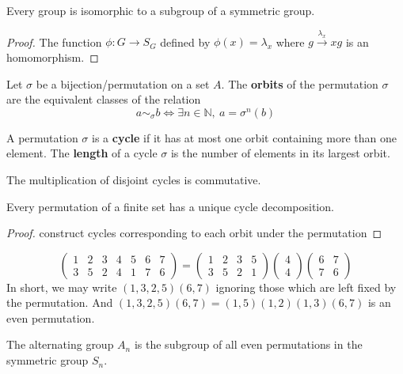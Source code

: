 \begin{theorem}[Cayley]
	Every group is isomorphic to a subgroup of a symmetric group.
\end{theorem}
\begin{proof}
	The function $\phi : G \to S_G$ defined by $\phi(x) = \lambda_x$ where $g \overset{\lambda_x}{\to} xg$ is an homomorphism.
\end{proof}

\begin{definition}
	Let $\sigma$ be a bijection/permutation on a set $A$.
	The \textbf{orbits} of the permutation $\sigma$ are the equivalent classes of the relation 
	$$a \sim_\sigma b \iff \exists n \in \mathbb{N},\ a = \sigma^n(b)$$
\end{definition}

\begin{definition}
	A permutation $\sigma$ is a \textbf{cycle} if it has at most one orbit containing more than one element.
	The \textbf{length} of a cycle $\sigma$ is the number of elements in its largest orbit. 
\end{definition}
	The multiplication of disjoint cycles is commutative.

\begin{theorem}
	Every permutation of a finite set has a unique cycle decomposition.
\end{theorem}
\begin{proof}
	construct cycles corresponding to each orbit under the permutation
\end{proof}
$$ \begin{pmatrix} 1 & 2 & 3 & 4 & 5 & 6 & 7 \\ 3 & 5 & 2 & 4 & 1 & 7 & 6 \end{pmatrix} = \begin{pmatrix} 1 & 2 & 3 & 5 \\ 3 & 5 & 2 & 1 \end{pmatrix} \begin{pmatrix}4 \\ 4\end{pmatrix} \begin{pmatrix} 6 & 7 \\ 7 & 6 \end{pmatrix}$$
	In short, we may write $(1,3,2,5)(6,7)$ ignoring those which are left fixed by the permutation.
	And $(1,3,2,5)(6,7) = (1,5)(1,2)(1,3)(6,7)$ is an even permutation.	

\begin{definition}
	The alternating group $A_n$ is the subgroup of all even permutations in the symmetric group $S_n$.
\end{definition}

